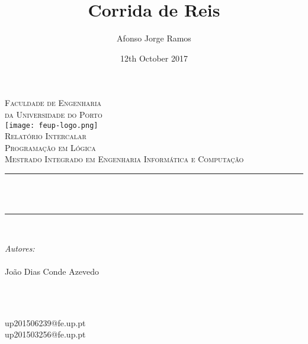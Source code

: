 \documentclass[12pt]{article}
\title{Corrida de Reis}													%
\author{Afonso Jorge Ramos}											%
\date{12th October 2017}												%
\makeatletter
\let\thetitle\@title
\let\theauthor\@author
\let\thedate\@date
\makeatother
\begin{document}

\begin{titlepage}
	\centering
    
	
    \textsc{\LARGE Faculdade de Engenharia \\ da Universidade do Porto}\\[2.0 cm]	%
\texttt{[image: feup-logo.png]}\\[1.5 cm]							%
	\textsc{\Large Relatório Intercalar}\\[0.8 cm]							%
	\textsc{\large Programação em Lógica \\[0.8 cm] Mestrado Integrado em Engenharia Informática e
Computação}\\[0.5 cm]													%
	\rule{\linewidth}{0.2 mm} \\[0.4 cm]
	{ \huge \bfseries \thetitle}\\
	\rule{\linewidth}{0.2 mm} \\[1.5 cm]
	
	\begin{minipage}{0.4\textwidth}
		\begin{flushleft} \large
			\emph{Autores:}\\
			\theauthor \\ João Dias Conde Azevedo
			\end{flushleft}
			\end{minipage}~
			\begin{minipage}{0.4\textwidth}
			\begin{flushright} \large
			\emph{} \\
			up201506239@fe.up.pt	\\  up201503256@fe.up.pt
		\end{flushright}
	\end{minipage}\\[2 cm]
	
	{\large \thedate}\\[3 cm]
 
	\vfill
	
\end{titlepage}


\tableofcontents
\pagebreak

\end{document}

